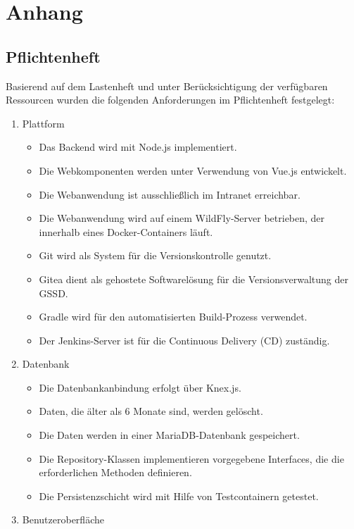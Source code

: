
\appendix
\section{Anhang}
\subsection{Pflichtenheft}\label{appendix:a1}\par
Basierend auf dem Lastenheft und unter Berücksichtigung der verfügbaren Ressourcen wurden die folgenden Anforderungen im Pflichtenheft festgelegt:

\begin{enumerate}
\item Plattform
\begin{itemize}
\item Das Backend wird mit Node.js implementiert.
\item Die Webkomponenten werden unter Verwendung von Vue.js entwickelt.
\item Die Webanwendung ist ausschließlich im Intranet erreichbar.
\item Die Webanwendung wird auf einem WildFly-Server betrieben, der innerhalb eines Docker-Containers läuft.
\item Git wird als System für die Versionskontrolle genutzt.
\item Gitea dient als gehostete Softwarelösung für die Versionsverwaltung der \acs{GSSD}.
\item Gradle wird für den automatisierten Build-Prozess verwendet.
\item Der Jenkins-Server ist für die Continuous Delivery (CD) zuständig.
\end{itemize}
\item Datenbank
\begin{itemize}
\item Die Datenbankanbindung erfolgt über Knex.js.
\item Daten, die älter als 6 Monate sind, werden gelöscht.
\item Die Daten werden in einer MariaDB-Datenbank gespeichert.
\item Die Repository-Klassen implementieren vorgegebene Interfaces, die die erforderlichen Methoden definieren.
\item Die Persistenzschicht wird mit Hilfe von Testcontainern getestet.
\end{itemize}
\item Benutzeroberfläche
\begin{itemize}

\end{itemize}
\end{enumerate}
